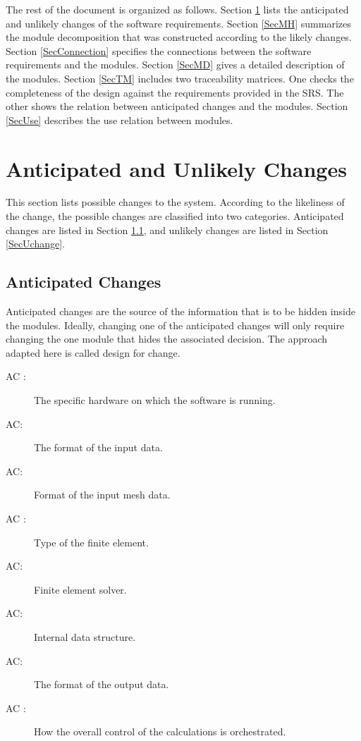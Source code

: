 \documentclass[12pt, titlepage]{article}
\newcounter{acnum} \newcommand{\actheacnum}{AC\theacnum}
\begin{document}
	The rest of the document is organized as follows. Section \ref{SecChange} lists
	the anticipated and unlikely changes of the software requirements. Section
	\ref{SecMH} summarizes the module decomposition that was constructed according
	to the likely changes. Section \ref{SecConnection} specifies the connections
	between the software requirements and the modules. Section \ref{SecMD} gives a
	detailed description of the modules. Section \ref{SecTM} includes two
	traceability matrices. One checks the completeness of the design against the
	requirements provided in the SRS. The other shows the relation between
	anticipated changes and the modules. Section \ref{SecUse} describes the use
	relation between modules.
	
	\section{Anticipated and Unlikely Changes} \label{SecChange}
	
	This section lists possible changes to the system. According to the likeliness
	of the change, the possible changes are classified into two categories.
	Anticipated changes are listed in Section \ref{SecAchange}, and unlikely
	changes are listed in Section \ref{SecUchange}.
	
	\subsection{Anticipated Changes} \label{SecAchange}
	
	Anticipated changes are the source of the information that is to be hidden
	inside the modules. Ideally, changing one of the anticipated changes will only
	require changing the one module that hides the associated decision. The
	approach adapted here is called design for change.
	
	\begin{description} \item[ \actheacnum
		\label{acHardware}:] The specific hardware on which the software is running.
		\item[ \actheacnum \label{acInput}:] The format of the
		input data. \item[ \actheacnum \label{acMeshIn}:] Format
		of the input mesh data. \item[ \actheacnum
		\label{acFiniteElement}:] Type of the finite element.
		\item[ \actheacnum \label{acFEM}:] Finite element solver.
		\item[ \actheacnum \label{acData}:] Internal data
		structure. \item[ \actheacnum \label{acOut}:] The format
		of the output data. \item[ \actheacnum
		\label{acSControl}:] How the overall control of the calculations is
		orchestrated.
		
		
	\end{description}
	
\end{document}
